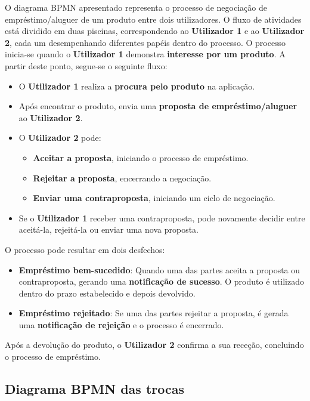 \documentclass[a4paper, 12pt]{article} %
\begin{document}
O diagrama BPMN apresentado representa o processo de negociação de empréstimo/aluguer de um produto entre dois utilizadores. O fluxo de atividades está dividido em duas piscinas, correspondendo ao \textbf{Utilizador 1} e ao \textbf{Utilizador 2}, cada um desempenhando diferentes papéis dentro do processo. O processo inicia-se quando o \textbf{Utilizador 1} demonstra \textbf{interesse por um produto}. A partir deste ponto, segue-se o seguinte fluxo:

\begin{itemize}
	\item O \textbf{Utilizador 1} realiza a \textbf{procura pelo produto} na aplicação.
	\item Após encontrar o produto, envia uma \textbf{proposta de empréstimo/aluguer} ao \textbf{Utilizador 2}.
	\item O \textbf{Utilizador 2} pode:
	\begin{itemize}
		\item \textbf{Aceitar a proposta}, iniciando o processo de empréstimo.
		\item \textbf{Rejeitar a proposta}, encerrando a negociação.
		\item \textbf{Enviar uma contraproposta}, iniciando um ciclo de negociação.
	\end{itemize}
	\item Se o \textbf{Utilizador 1} receber uma contraproposta, pode novamente decidir entre aceitá-la, rejeitá-la ou enviar uma nova proposta.
\end{itemize}

O processo pode resultar em dois desfechos:
\begin{itemize}
	\item \textbf{Empréstimo bem-sucedido}: Quando uma das partes aceita a proposta ou contraproposta, gerando uma \textbf{notificação de sucesso}. O produto é utilizado dentro do prazo estabelecido e depois devolvido.
	\item \textbf{Empréstimo rejeitado}: Se uma das partes rejeitar a proposta, é gerada uma \textbf{notificação de rejeição} e o processo é encerrado.
\end{itemize}

Após a devolução do produto, o \textbf{Utilizador 2} confirma a sua receção, concluindo o processo de empréstimo.

\newpage
\subsection{Diagrama BPMN das trocas}
\end{document}
